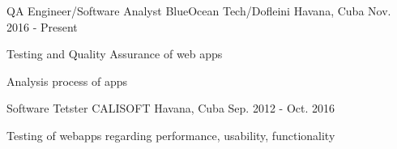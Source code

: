 


\begin{cventries}


\cventry
{QA Engineer/Software Analyst} %
{BlueOcean Tech/Dofleini} %
{Havana, Cuba} %
{Nov. 2016 - Present} %
{ %
\begin{cvitems}
\item {Testing and Quality Assurance of web apps}
\item {Analysis process of apps}
\end{cvitems}
}


\cventry
{Software Tetster} %
{CALISOFT} %
{Havana, Cuba} %
{Sep. 2012 - Oct. 2016} %
{ %
\begin{cvitems}
\item {Testing of webapps regarding performance, usability, functionality}
\end{cvitems}
}


\end{cventries}

